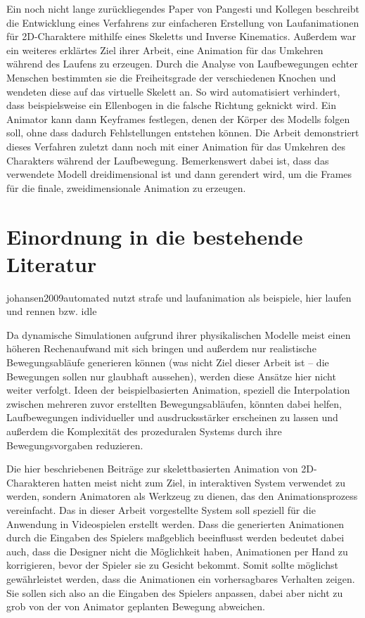 Ein noch nicht lange zurückliegendes Paper von Pangesti und Kollegen \cite{pangesti2019analysis} beschreibt die Entwicklung eines Verfahrens zur einfacheren Erstellung von Laufanimationen für 2D-Charaktere mithilfe eines Skeletts und Inverse Kinematics. Außerdem war ein weiteres erklärtes Ziel ihrer Arbeit, eine Animation für das Umkehren während des Laufens zu erzeugen. Durch die Analyse von Laufbewegungen echter Menschen bestimmten sie die Freiheitsgrade der verschiedenen Knochen und wendeten diese auf das virtuelle Skelett an. So wird automatisiert verhindert, dass beispielsweise ein Ellenbogen in die falsche Richtung geknickt wird. Ein Animator kann dann Keyframes festlegen, denen der Körper des Modells folgen soll, ohne dass dadurch Fehlstellungen entstehen können. Die Arbeit demonstriert dieses Verfahren zuletzt dann noch mit einer Animation für das Umkehren des Charakters während der Laufbewegung. Bemerkenswert dabei ist, dass das verwendete Modell dreidimensional ist und dann gerendert wird, um die Frames für die finale, zweidimensionale Animation zu erzeugen.


\section{Einordnung in die bestehende Literatur}
johansen2009automated nutzt strafe und laufanimation als beispiele, hier laufen und rennen bzw. idle

Da dynamische Simulationen aufgrund ihrer physikalischen Modelle meist einen höheren Rechenaufwand mit sich bringen und außerdem nur realistische Bewegungsabläufe generieren können (was nicht Ziel dieser Arbeit ist – die Bewegungen sollen nur glaubhaft aussehen), werden diese Ansätze hier nicht weiter verfolgt. Ideen der beispielbasierten Animation, speziell die Interpolation zwischen mehreren zuvor erstellten Bewegungsabläufen, könnten dabei helfen, Laufbewegungen individueller und ausdrucksstärker erscheinen zu lassen und außerdem die Komplexität des prozeduralen Systems durch ihre Bewegungsvorgaben reduzieren.

Die hier beschriebenen Beiträge zur skelettbasierten Animation von 2D-Charakteren hatten meist nicht zum Ziel, in interaktiven System verwendet zu werden, sondern Animatoren als Werkzeug zu dienen, das den Animationsprozess vereinfacht. Das in dieser Arbeit vorgestellte System soll speziell für die Anwendung in Videospielen erstellt werden. Dass die generierten Animationen durch die Eingaben des Spielers maßgeblich beeinflusst werden bedeutet dabei auch, dass die Designer nicht die Möglichkeit haben, Animationen per Hand zu korrigieren, bevor der Spieler sie zu Gesicht bekommt. Somit sollte möglichst gewährleistet werden, dass die Animationen ein vorhersagbares Verhalten zeigen. Sie sollen sich also an die Eingaben des Spielers anpassen, dabei aber nicht zu grob von der von Animator geplanten Bewegung abweichen.